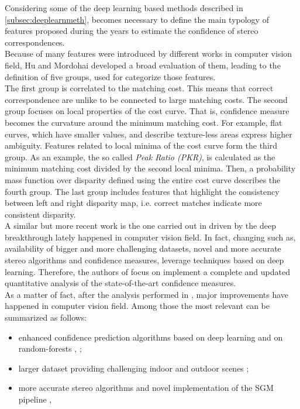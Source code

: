 Considering some of the deep learning based methods described in \ref{subsec:deeplearnmeth}, becomes necessary to define the main typology of features proposed during the years to estimate the confidence of stereo correspondences. \\
Because of many features were introduced by different works in computer vision field, Hu and Mordohai \cite{Hu2012} developed a broad evaluation of them, leading to the definition of five groups, used for categorize those features. \\
The first group is correlated to the matching cost. 
This means that correct correspondence are unlike to be connected to large matching costs. 
The second group focuses on local properties of the cost curve. 
That is, confidence measure becomes the curvature around the minimum matching cost. 
For example, flat curves, which have smaller values, and describe texture-less areas express higher ambiguity.
Features related to local minima of the cost curve form the third group. 
As an example, the so called \textit{Peak Ratio (PKR)}, is calculated as the minimum matching cost divided by the second local minima.
Then, a probability mass function over disparity defined using the entire cost curve describes the fourth group.
The last group includes features that highlight the consistency between left and right disparity map, i.e. correct matches indicate more consistent disparity.\\
A similar but more recent work is the one carried out in \cite{Poggi2017} driven by the deep breakthrough lately happened in computer vision field. 
In fact, changing such as, availability of bigger and more challenging datasets, novel and more accurate stereo algorithms and confidence measures, leverage techniques based on deep learning.
Therefore, the authors of \cite{Poggi2017} focus on implement a complete and updated quantitative analysis of the state-of-the-art confidence measures.\\
As a matter of fact, after the analysis performed in \cite{Hu2012}, major improvements have happened in computer vision field.
Among those the most relevant can be summarized as follows:
\begin{itemize}
	\item enhanced confidence prediction algorithms based on deep learning \cite{poggi2016learning} and on random-forests \cite{Spyropoulos2014}, \cite{Park2015};
	\item larger dataset providing challenging indoor and outdoor scenes \cite{Mayer2016};
	\item more accurate stereo algorithms and novel implementation of the SGM pipeline \cite{Seki2016}, \cite{Zbontar2016}
\end{itemize}
